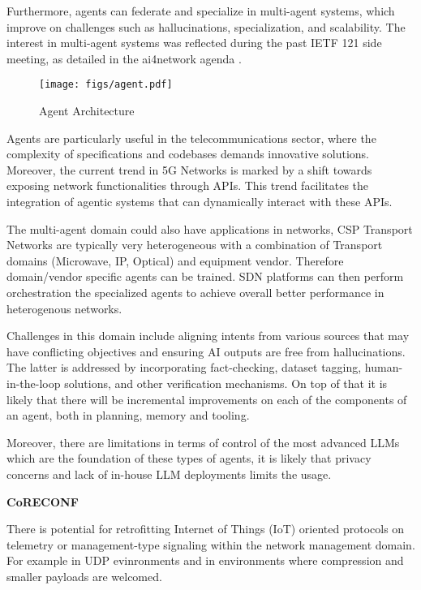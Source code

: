 \documentclass[10pt,sigconf]{iabart}
\begin{document}
Furthermore, agents can federate and specialize in multi-agent systems, which improve on challenges such as hallucinations, specialization, and scalability. The interest in multi-agent systems was reflected during the past IETF 121 side meeting, as detailed in the ai4network agenda \cite{ai4network-agenda}. 

\begin{figure}[h]
  \centering
  \texttt{[image: figs/agent.pdf]}
  \caption{Agent Architecture}
  \label{fig:agent_architecture}
\end{figure}

Agents are particularly useful in the telecommunications sector, where the complexity of specifications and codebases demands innovative solutions. Moreover, the current trend in 5G Networks is marked by a shift towards exposing network functionalities through APIs. This trend facilitates the integration of agentic systems that can dynamically interact with these APIs.

The multi-agent domain could also have applications in networks, CSP Transport Networks are typically very heterogeneous with a combination of Transport domains (Microwave, IP, Optical) and equipment vendor. Therefore domain/vendor specific agents can be trained. SDN platforms can then perform orchestration the specialized agents to achieve overall better performance in heterogenous networks.

Challenges in this domain include aligning intents from various sources that may have conflicting objectives and ensuring AI outputs are free from hallucinations. The latter is addressed by incorporating fact-checking, dataset tagging, human-in-the-loop solutions, and other verification mechanisms. On top of that it is likely that there will be incremental improvements on each of the components of an agent, both in planning, memory and tooling.

Moreover, there are limitations in terms of control of the most advanced LLMs which are the foundation of these types of agents, it is likely that privacy concerns and lack of in-house LLM deployments limits the usage.

\textbf{CoRECONF}

There is potential for retrofitting Internet of Things (IoT) oriented protocols on telemetry or management-type signaling within the network management domain. For example in UDP evinronments and in environments where compression and smaller payloads are welcomed. 
\end{document}
